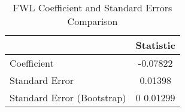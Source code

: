 
\begin{table}[ht]
\centering
\begin{tabular}{l c}
\hline
 & Statistic \\
\hline
Coefficient &  -0.07822  \\
Standard Error &  0.01398  \\
Standard Error (Bootstrap) &  0 0.01299  \\
\hline
\end{tabular}
\caption{FWL Coefficient and Standard Errors Comparison}
\label{tab:fwl_comparison}
\end{table}
